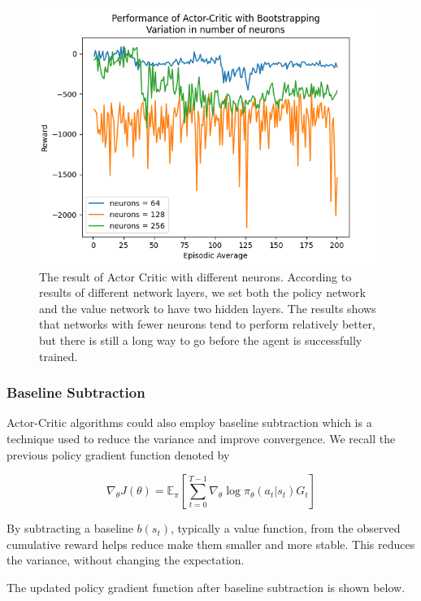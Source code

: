 \documentclass{article}
\begin{document}
\begin{figure}[h!]
\centering
\includegraphics[width=0.85\linewidth]{Report/images/08.Performance_of_Actor_Critic_BS_Neurons.png}
\caption{\label{fig:ActorCritic for different Neurons}The result of Actor Critic with different neurons. According to results of different network layers, we set both the policy network and the value network to have two hidden layers. The results shows that networks with fewer neurons tend to perform relatively better, but there is still a long way to go before the agent is successfully trained.}
\end{figure}

\subsubsection{Baseline Subtraction}
Actor-Critic algorithms could also employ baseline subtraction which is a technique used to reduce the variance and improve convergence. We recall the previous policy gradient function denoted by 

\begin{equation*}
\nabla_\theta J(\theta) = \mathbb{E}_\pi[\sum _{t=0}^{T-1}  \nabla_\theta \log\pi_\theta (a_t|s_t)G_t]
\end{equation*}

By subtracting a baseline $b(s_t)$, typically a value function,  from the observed cumulative reward helps reduce make them smaller and more stable. This reduces the variance, without changing the expectation. \cite{david-ucl-lecture}

The updated policy gradient function after baseline subtraction is shown below. 
\end{document}

